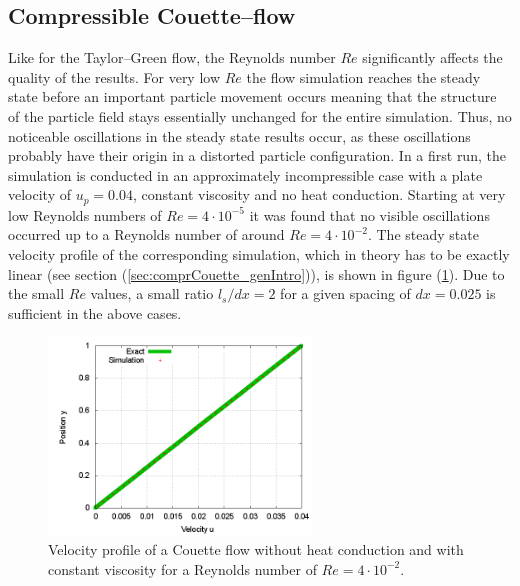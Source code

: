 \documentclass{report}
\begin{document}

\subsection{Compressible Couette--flow}

Like for the Taylor--Green flow, the Reynolds number $Re$ significantly affects the quality of the results. For very low $Re$ the flow simulation reaches the steady state before an important particle movement occurs meaning that the structure of the particle field stays essentially unchanged for the entire simulation. Thus, no noticeable oscillations in the steady state results occur, as these oscillations probably have their origin in a distorted particle configuration. 
In a first run, the simulation is conducted in an approximately incompressible case with a plate velocity of $u_p=0.04$, constant viscosity and no heat conduction. Starting at very low Reynolds numbers of $Re=4\cdot10^{-5}$ it was found that no visible oscillations occurred up to a Reynolds number of around $Re=4\cdot10^{-2}$. The steady state velocity profile of the corresponding simulation, which in theory has to be exactly linear (see section (\ref{sec:comprCouette_genIntro})), is shown in figure (\ref{fig:CompCouette_U_const_eta}). Due to the small $Re$ values, a small ratio $l_s/dx=2$ for a given spacing of $dx=0.025$ is sufficient in the above cases. 


\begin{figure}
 \centering
\label{fig:CompCouette_U_const_eta}
\includegraphics[width=7cm]{Graphics/results/CompressibleCouette/N2x40_supLen_dx2_eta1/U_profiles000001000019}
\caption[steady State velocity incompressible Couette]{Velocity profile of a Couette flow without heat conduction and with constant viscosity for a Reynolds number of $Re=4\cdot10^{-2}$.}
\end{figure}
\end{document}

